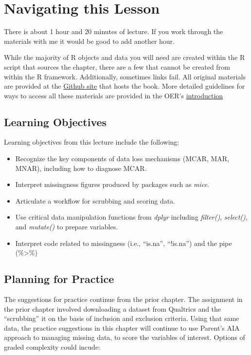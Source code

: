 \documentclass[
  english,
]{book}
\providecommand{\tightlist}{%
  \setlength{\itemsep}{0pt}\setlength{\parskip}{0pt}}
\begin{document}
\hypertarget{navigating-this-lesson-1}{%
\section{Navigating this Lesson}\label{navigating-this-lesson-1}}

There is about 1 hour and 20 minutes of lecture. If you work through the materials with me it would be good to add another hour.

While the majority of R objects and data you will need are created within the R script that sources the chapter, there are a few that cannot be created from within the R framework. Additionally, sometimes links fail. All original materials are provided at the \href{https://github.com/lhbikos/ReC_MultivModel}{Github site} that hosts the book. More detailed guidelines for ways to access all these materials are provided in the OER's \protect\hyperlink{ReCintro}{introduction}

\hypertarget{learning-objectives-1}{%
\subsection{Learning Objectives}\label{learning-objectives-1}}

Learning objectives from this lecture include the following:

\begin{itemize}
\tightlist
\item
  Recognize the key components of data loss mechanisms (MCAR, MAR, MNAR), including how to diagnose MCAR.
\item
  Interpret missingness figures produced by packages such as \emph{mice}.
\item
  Articulate a workflow for scrubbing and scoring data.
\item
  Use critical data manipulation functions from \emph{dplyr} including \emph{filter()}, \emph{select()}, and \emph{mutate()} to prepare variables.
\item
  Interpret code related to missingness (i.e., ``is.na'', ``!is.na'') and the pipe (\%\textgreater\%)
\end{itemize}

\hypertarget{planning-for-practice-1}{%
\subsection{Planning for Practice}\label{planning-for-practice-1}}

The suggestions for practice continue from the prior chapter. The assignment in the prior chapter involved downloading a dataset from Qualtrics and the ``scrubbing'' it on the basis of inclusion and exclusion criteria. Using that same data, the practice suggestions in this chapter will continue to use Parent's \citeyearpar{parent_handling_2013} AIA approach to managing missing data, to score the variables of interest. Options of graded complexity could incude:
\end{document}
